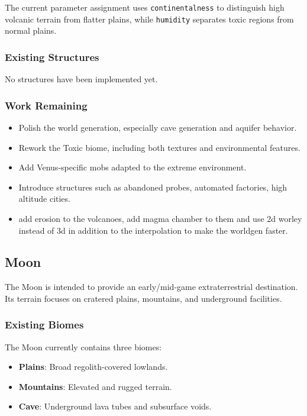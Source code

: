 \documentclass{article}
\begin{document}
The current parameter assignment uses \texttt{continentalness} to distinguish high volcanic terrain from flatter plains, while \texttt{humidity} separates toxic regions from normal plains.

\subsubsection{Existing Structures}

No structures have been implemented yet.

\subsubsection{Work Remaining}

\begin{itemize}
    \item Polish the world generation, especially cave generation and aquifer behavior.
    \item Rework the Toxic biome, including both textures and environmental features.
    \item Add Venus-specific mobs adapted to the extreme environment.
    \item Introduce structures such as abandoned probes, automated factories, high altitude cities.
    \item add erosion to the volcanoes, add magma chamber to them and use 2d worley instead of 3d in addition to the interpolation to make the worldgen faster.
\end{itemize}


\subsection{Moon}

The Moon is intended to provide an early/mid-game extraterrestrial destination. Its terrain focuses on cratered plains, mountains, and underground facilities.

\subsubsection{Existing Biomes}

The Moon currently contains three biomes:

\begin{itemize}
    \item \textbf{Plains}: Broad regolith-covered lowlands.
    \item \textbf{Mountains}: Elevated and rugged terrain.
    \item \textbf{Cave}: Underground lava tubes and subsurface voids.
\end{itemize}
\end{document}
